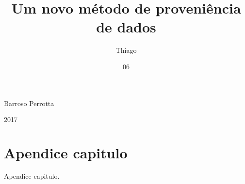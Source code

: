 \documentclass[grad,pdftex,numbers]{coppetex/coppe}
\begin{document}
  \title{Um novo método de proveniência de dados}
  \foreigntitle{}
  
  \author{Thiago}{Barroso Perrotta}


  \date{06}{2017}



  \maketitle
  \frontmatter{}

  \dedication{dedication aqui}
  
  

  \tableofcontents
  \listoffigures
  \listoftables
  \printlosymbols{}
  \printloabbreviations{}

  \mainmatter{}
  

  \backmatter{}
  
  

  \appendix

  \chapter{Apendice capitulo}

  Apendice capitulo.
\end{document}
